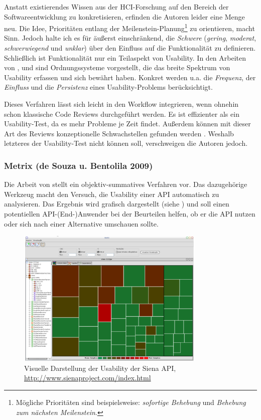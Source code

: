 Anstatt existierendes Wissen aus der HCI-Forschung auf den Bereich der Softwareentwicklung zu konkretisieren, erfinden die Autoren leider eine Menge neu. Die Idee, Prioritäten entlang der Meilenstein-Planung\footnote{Mögliche Prioritäten sind beispielsweise: \textit{sofortige Behebung} und \textit{Behebung zum nächsten Meilenstein}.} zu orientieren, macht Sinn. Jedoch halte ich es für äußerst einschränkend, die \textit{Schwere} (\textit{gering}, \textit{moderat}, \textit{schwerwiegend} und \textit{unklar}) über den Einfluss auf die Funktionalität zu definieren. Schließlich ist Funktionalität nur ein Teilaspekt von Usability. In den Arbeiten von \cite{Nielsen:1993vk}, \cite{Sarodnick:2006vc} und \cite{Kahlert:2011wr} sind Ordnungssysteme vorgestellt, die das breite Spektrum von Usability erfassen und sich bewährt haben. Konkret werden u.a. die \textit{Frequenz}, der \textit{Einfluss} und die \textit{Persistenz} eines Usability-Problems berücksichtigt.
  
Dieses Verfahren lässt sich leicht in den Workflow integrieren, wenn ohnehin schon klassische Code Reviews durchgeführt werden. Es ist effizienter als ein Usability-Test, da es mehr Probleme je Zeit findet. Außerdem können mit dieser Art des Reviews konzeptionelle Schwachstellen gefunden werden \citep{Farooq:2010iv}. Weshalb letzteres der Usability-Test nicht können soll, verschweigen die Autoren jedoch.

\subsubsection{Metrix (de Souza u. Bentolila 2009)}
Die Arbeit von \cite{deSouza:ek} stellt ein objektiv-summatives Verfahren vor. Das dazugehörige Werkzeug macht den Versuch, die Usability einer API automatisch zu analysieren. Das Ergebnis wird grafisch dargestellt (siehe ) und soll einen potentiellen API-(End-)Anwender bei der Beurteilen helfen, ob er die API nutzen oder sich nach einer Alternative umschauen sollte.


\begin{figure}
  \centering
    \includegraphics[width=0.8\textwidth]{Figures/tools/metrix.png}
  \caption[Visuelle Darstellung der Usability der Siena API]{Visuelle Darstellung der Usability der Siena API, \url{http://www.sienaproject.com/index.html} \citep{deSouza:ek}}
  \label{fig:metrix}
\end{figure}


